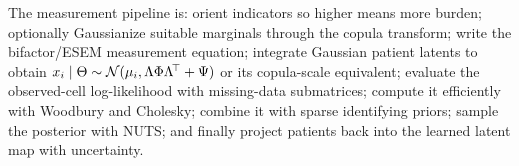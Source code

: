 \begin{keyresult}
The measurement pipeline is: orient indicators so higher means more burden; optionally Gaussianize suitable
marginals through the copula transform; write the bifactor/ESEM measurement equation; integrate Gaussian patient
latents to obtain $x_i\mid\Theta\sim\mathcal{N}(\mu_i,\Lambda\Phi\Lambda^{\!\top}+\Psi)$ or its copula-scale equivalent;
evaluate the observed-cell log-likelihood with missing-data submatrices; compute it efficiently with Woodbury and
Cholesky; combine it with sparse identifying priors; sample the posterior with NUTS; and finally project patients
back into the learned latent map with uncertainty.
\end{keyresult}
